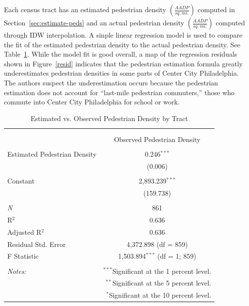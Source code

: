 \documentclass[paper=letterpaper, fontsize=11pt]{scrartcl}
\begin{document}
Each census tract has an estimated pedestrian density $\left(\frac{AADP}{sq.\:mi.}\right)$ computed in Section~\ref{sec:estimate-peds} and an actual pedestrian density $\left(\frac{AADP}{sq.\:mi.}\right)$ computed through IDW interpolation. A sinple linear regression model is used to compare the fit of the estimated pedestrian density to the actual pedestrian density. See Table~\ref{r1-fit}. While the model fit is good overall, a map of the regression residuals shown in Figure~\ref{resid} indicates that the pedestrian estimation formula greatly underestimates pedestrian densities in some parts of Center City Philadelphia. The authors suspect the underestimation occurs because the pedestrian estimation does not account for ``last-mile pedestrian commuters,'' those who commute into Center City Philadelphia for school or work.

\begin{table}[!htbp] \centering 
	\caption{Estimated vs. Observed Pedestrian Density by Tract} 
	\label{r1-fit} 
	\begin{tabular}{@{\extracolsep{5pt}}lc} 
		\\[-1.8ex]\hline 
		\hline \\[-1.8ex] 
		\\[-1.8ex] & Observed Pedestrian Density \\ 
		\hline \\[-1.8ex] 
		Estimated Pedestrian Density & 0.246$^{***}$ \\ 
		& (0.006) \\ 
		& \\ 
		Constant & 2,893.239$^{***}$ \\ 
		& (159.738) \\ 
		& \\ 
		\textit{N} & 861 \\ 
		R$^{2}$ & 0.636 \\ 
		Adjusted R$^{2}$ & 0.636 \\ 
		Residual Std. Error & 4,372.898 (df = 859) \\ 
		F Statistic & 1,503.894$^{***}$ (df = 1; 859) \\ 
		\hline 
		\hline \\[-1.8ex] 
		\textit{Notes:} & \multicolumn{1}{r}{$^{***}$Significant at the 1 percent level.} \\ 
		& \multicolumn{1}{r}{$^{**}$Significant at the 5 percent level.} \\ 
		& \multicolumn{1}{r}{$^{*}$Significant at the 10 percent level.} \\ 
	\end{tabular} 
\end{table} 
\end{document}
